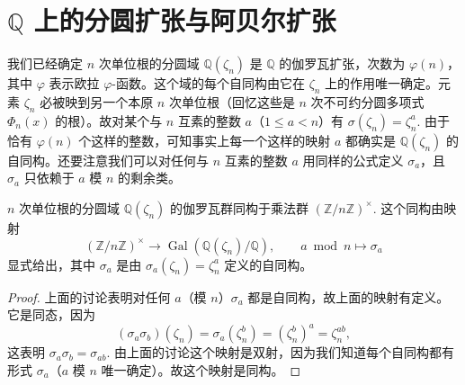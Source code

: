 \section{\(\mathbb{Q}\) 上的分圆扩张与阿贝尔扩张}

我们已经确定 \(n\) 次单位根的分圆域 \(\mathbb{Q}(\zeta_n)\) 是 \(\mathbb{Q}\) 的伽罗瓦扩张，次数为 \(\varphi(n)\)，其中 \(\varphi\) 表示欧拉 \(\varphi\)-函数。这个域的每个自同构由它在 \(\zeta_n\) 上的作用唯一确定。元素 \(\zeta_n\) 必被映到另一个本原 \(n\) 次单位根（回忆这些是 \(n\) 次不可约分圆多项式 \(\Phi_n(x)\) 的根）。故对某个与 \(n\) 互素的整数 \(a\)（\(1 \leq a < n\)）有 \(\sigma(\zeta_n) = \zeta_n^a\). 由于恰有 \(\varphi(n)\) 个这样的整数，可知事实上每一个这样的映射 \(a\) 都确实是 \(\mathbb{Q}(\zeta_n)\) 的自同构。还要注意我们可以对任何与 \(n\) 互素的整数 \(a\) 用同样的公式定义 \(\sigma_a\)，且 \(\sigma_a\) 只依赖于 \(a\) 模 \(n\) 的剩余类。

\begin{theorem}\label{thm:14.26}
\(n\) 次单位根的分圆域 \(\mathbb{Q}(\zeta_n)\) 的伽罗瓦群同构于乘法群 \((\mathbb{Z}/n\mathbb{Z})^\times\). 这个同构由映射
\[
(\mathbb{Z}/n\mathbb{Z})^\times \to \operatorname{Gal}(\mathbb{Q}(\zeta_n)/\mathbb{Q}), \qquad a \bmod n \mapsto \sigma_a
\]
显式给出，其中 \(\sigma_a\) 是由 \(\sigma_a(\zeta_n) = \zeta_n^a\) 定义的自同构。
\end{theorem}

\begin{proof}
上面的讨论表明对任何 \(a\)（模 \(n\)）\(\sigma_a\) 都是自同构，故上面的映射有定义。它是同态，因为
\[
(\sigma_a\sigma_b)(\zeta_n) = \sigma_a(\zeta_n^b) = (\zeta_n^b)^a = \zeta_n^{ab},
\]
这表明 \(\sigma_a\sigma_b = \sigma_{ab}\). 由上面的讨论这个映射是双射，因为我们知道每个自同构都有形式 \(\sigma_a\)（\(a\) 模 \(n\) 唯一确定）。故这个映射是同构。
\end{proof}

